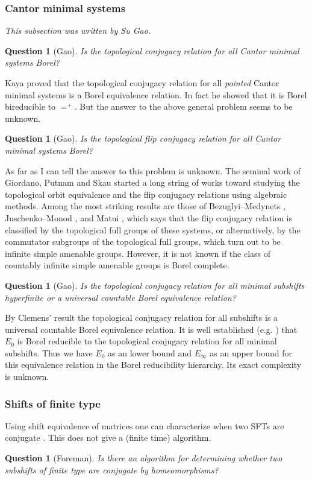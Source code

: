 \documentclass{article}
\newtheorem{question}[theorem]{Question}
\theoremstyle{definition}
\begin{document}
\subsubsection{Cantor minimal systems}
\textit{This subsection was written by Su Gao.} 
\begin{question} [Gao] Is the topological conjugacy relation for all Cantor minimal systems Borel?
\end{question}

Kaya \cite{Kaya} proved that the topological conjugacy relation for all \textit{pointed} Cantor minimal systems is a Borel equivalence relation. In fact he showed that it is Borel bireducible to $=^+$. But the answer to the above general problem seems to be unknown.

\begin{question} [Gao] Is the topological flip conjugacy relation for all Cantor minimal systems Borel?
\end{question}

As far as I can tell the answer to this problem is unknown. The seminal work of Giordano, Putnam and Skau \cite{GPS1} \cite{GPS2} started a long string of works toward studying the topological orbit equivalence and the flip conjugacy relations using algebraic methods. Among the most striking results are those of Bezuglyi--Medynets \cite{BM}, Juschenko--Monod \cite{JM}, and Matui \cite{Matui}, which says that the flip conjugacy relation is classified by the topological full groups of these systems, or alternatively, by the commutator subgroups of the topological full groups, which turn out to be infinite simple amenable groups. However, it is not known if the class of countably infinite simple amenable groups is Borel complete.

\begin{question} [Gao] Is the topological conjugacy relation for all minimal subshifts hyperfinite or a universal countable Borel equivalence relation?
\end{question}

By Clemens' result \cite{Clemens} the topological conjugacy relation for all subshifts is a universal countable Borel equivalence relation. It is well established (e.g. \cite{GH} \cite{Thomas}) that $E_0$ is Borel reducible to the topological conjugacy relation for all minimal subshifts. Thus we have $E_0$ as an lower bound and $E_\infty$ as an upper bound for this equivalence relation in the Borel reducibility hierarchy. Its exact complexity is unknown.

\subsubsection{Shifts of finite type}
Using shift equivalence of matrices one can characterize when two SFTs are conjugate \cite{williams73}. This does not give a (finite time) algorithm. 
\begin{question}
    [Foreman]
     Is there an algorithm for determining whether two subshifts of finite type are conjugate by homeomorphisms?
\end{question}
\end{document}
